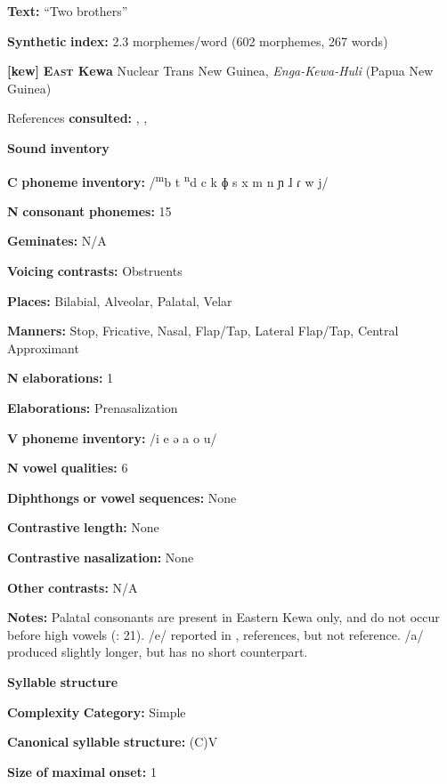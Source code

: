 \textbf{Text:} “Two brothers” \citep[92-97]{Vajda2004}

\textbf{Synthetic} \textbf{index:} 2.3 morphemes/word (602 morphemes, 267 words)

\textbf{[kew]}   \textbf{\textsc{East} \textbf{Kewa}}  Nuclear Trans New Guinea, \textit{Enga-Kewa-Huli} (Papua New Guinea)

References \textbf{consulted:} \citet{Franklin1971}, \citet{FranklinFranklin1962}, \citet{FranklinFranklin1978}

\textbf{Sound} \textbf{inventory}

\textbf{C} \textbf{phoneme} \textbf{inventory:} /\textsuperscript{m}b t \textsuperscript{n}d c k ɸ s x m n ɲ ɺ ɾ w j/

\textbf{N} \textbf{consonant} \textbf{phonemes:} 15

\textbf{Geminates:} N/A

\textbf{Voicing} \textbf{contrasts:} Obstruents

\textbf{Places:} Bilabial, Alveolar, Palatal, Velar

\textbf{Manners:} Stop, Fricative, Nasal, Flap/Tap, Lateral Flap/Tap, Central Approximant

\textbf{N} \textbf{elaborations:} 1

\textbf{Elaborations:} Prenasalization

\textbf{V} \textbf{phoneme} \textbf{inventory:} /i e ə a o u/

\textbf{N} \textbf{vowel} \textbf{qualities:} 6

\textbf{Diphthongs} \textbf{or} \textbf{vowel} \textbf{sequences:} None

\textbf{Contrastive} \textbf{length:} None

\textbf{Contrastive} \textbf{nasalization:} None

\textbf{Other} \textbf{contrasts:} N/A

\textbf{Notes:} Palatal consonants are present in Eastern Kewa only, and do not occur before high vowels (\citealt{FranklinFranklin1978}: 21). /e/ reported in ,  references, but not  reference. /a/ produced slightly longer, but has no short counterpart.

\textbf{Syllable} \textbf{structure}

\textbf{Complexity} \textbf{Category:} Simple

\textbf{Canonical} \textbf{syllable} \textbf{structure:} (C)V \citep[11-12]{Franklin1971}

\textbf{Size} \textbf{of} \textbf{maximal} \textbf{onset:} 1

